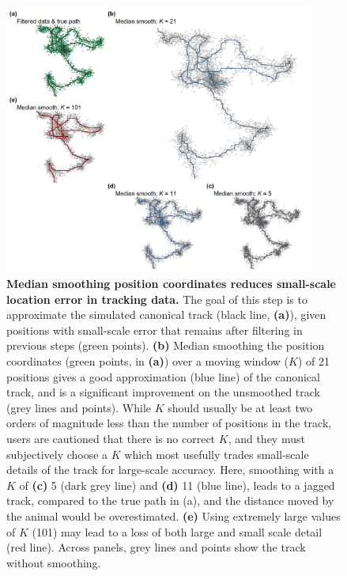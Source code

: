     \begin{figure}[ht!]
        \centering
        \includegraphics[width=0.9\textwidth]{figures/preprocessing/fig_04.png}
        \caption{
            \textbf{Median smoothing position coordinates reduces small-scale location error in tracking data.}
            The goal of this step is to approximate the simulated canonical track (black line, \textbf{(a)}), given positions with small-scale error that remains after filtering in previous steps (green points).
            \textbf{(b)} Median smoothing the position coordinates (green points, in \textbf{(a)}) over a moving window ($K$) of 21 positions gives a good approximation (blue line) of the canonical track, and is a significant improvement on the unsmoothed track (grey lines and points).
            While $K$ should usually be at least two orders of magnitude less than the number of positions in the track, users are cautioned that there is no correct $K$, and they must subjectively choose a $K$ which most usefully trades small-scale details of the track for large-scale accuracy.
            Here, smoothing with a $K$ of \textbf{(c)} 5 (dark grey line) and \textbf{(d)} 11 (blue line), leads to a jagged track, compared to the true path in (a), and the distance moved by the animal would be overestimated.
            \textbf{(e)} Using extremely large values of $K$ (101) may lead to a loss of both large and small scale detail (red line).
            Across panels, grey lines and points show the track without smoothing.
        }
        \label{preproc_fig_04}
    \end{figure}

